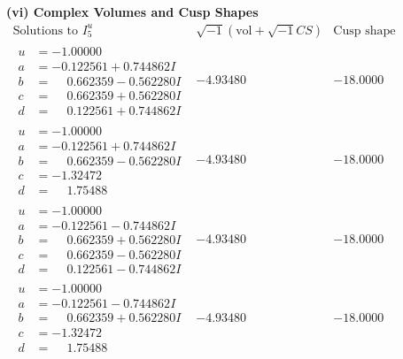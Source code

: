 \documentclass[1p]{elsarticle_modified}
\theoremstyle{definition}
\newcommand{\I}{\sqrt{-1}}
\begin{document}
\newpage\flushleft \textbf{(vi) Complex Volumes and Cusp Shapes}
$$\begin{array}{c|c|c}  
\text{Solutions to }I^u_{5}& \I (\text{vol} + \sqrt{-1}CS) & \text{Cusp shape}\\
 \hline 
\begin{aligned}
u &= -1.00000\phantom{ +0.000000I} \\
a &= -0.122561 + 0.744862 I \\
b &= \phantom{-}0.662359 - 0.562280 I \\
c &= \phantom{-}0.662359 + 0.562280 I \\
d &= \phantom{-}0.122561 + 0.744862 I\end{aligned}
 & -4.93480\phantom{ +0.000000I} & -18.0000\phantom{ +0.000000I} \\ \hline\begin{aligned}
u &= -1.00000\phantom{ +0.000000I} \\
a &= -0.122561 + 0.744862 I \\
b &= \phantom{-}0.662359 - 0.562280 I \\
c &= -1.32472\phantom{ +0.000000I} \\
d &= \phantom{-}1.75488\phantom{ +0.000000I}\end{aligned}
 & -4.93480\phantom{ +0.000000I} & -18.0000\phantom{ +0.000000I} \\ \hline\begin{aligned}
u &= -1.00000\phantom{ +0.000000I} \\
a &= -0.122561 - 0.744862 I \\
b &= \phantom{-}0.662359 + 0.562280 I \\
c &= \phantom{-}0.662359 - 0.562280 I \\
d &= \phantom{-}0.122561 - 0.744862 I\end{aligned}
 & -4.93480\phantom{ +0.000000I} & -18.0000\phantom{ +0.000000I} \\ \hline\begin{aligned}
u &= -1.00000\phantom{ +0.000000I} \\
a &= -0.122561 - 0.744862 I \\
b &= \phantom{-}0.662359 + 0.562280 I \\
c &= -1.32472\phantom{ +0.000000I} \\
d &= \phantom{-}1.75488\phantom{ +0.000000I}\end{aligned}
 & -4.93480\phantom{ +0.000000I} & -18.0000\phantom{ +0.000000I} \\ \hline\begin{aligned}

\end{aligned}
\end{array}$$
\end{document}
